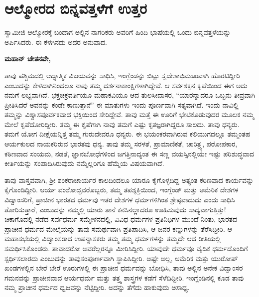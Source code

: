
\chapter{ಆಲ್ಮೋರದ ಬಿನ್ನವತ್ತಳೆಗೆ ಉತ್ತರ}

ಸ್ವಾಮೀಜಿ ಆಲ್ಮೋರಕ್ಕೆ ಬಂದಾಗ ಅಲ್ಲಿನ ನಾಗರಿಕರು ಅವರಿಗೆ ಹಿಂದಿ ಭಾಷೆಯಲ್ಲಿ ಒಂದು ಬಿನ್ನವತ್ತಳೆಯನ್ನು ಅರ್ಪಿಸಿದರು. ಈ ಕೆಳಗಿನದು ಅದರ ಅನುವಾದ.

\vskip 6pt

\textbf{ಮಹಾನ್​ ಚೇತನವೇ,}

\vskip 6pt

ತಾವು ಪಶ್ಚಿಮದಲ್ಲಿ ಆಧ್ಯಾತ್ಮಿಕ ವಿಜಯವನ್ನು ಸಾಧಿಸಿ, ಇಂಗ್ಲೆಂಡನ್ನು ಬಿಟ್ಟು ಸ್ವದೇಶಾಭಿಮುಖವಾಗಿ ಹೊರಟಿದ್ದೀರಿ ಎಂಬುದನ್ನು ಕೇಳಿದಾಗಿನಿಂದಲೂ ನಾವು ತಮ್ಮ ದರ್ಶನಾಕಾಂಕ್ಷಿಗಳಾಗಿದ್ದೇವೆ. ಆ ಸರ್ವಶಕ್ತನ ಕೃಪೆಯಿಂದ ಈಗ ಅದು ನಮಗೆ ಲಭ್ಯವಾಗಿದೆ. ಭಕ್ತಚಕ್ರವರ್ತಿಯೂ ಮಹಾಕವಿಯೂ ಆದ ತುಲಸೀದಾಸರ, “ಯಾರನ್ನಾದರೂ ಒಬ್ಬನು ತೀವ್ರವಾಗಿ ಪ್ರೀತಿಸಿದರೆ ಅವನನ್ನು ಕಂಡೇ ಕಾಣುತ್ತಾನೆ” ಈ ಮಾತುಗಳು ಇಂದು ಪೂರ್ಣವಾಗಿ ಸತ್ಯವಾಗಿದೆ. ಇಂದು ನಾವಿಲ್ಲಿ ತಮ್ಮನ್ನು ವಿಶ್ವಾಸಪೂರ್ವಕವಾದ ಭಕ್ತಿಯಿಂದ ಸೇರಿದ್ದೇವೆ. ತಾವು ಮತ್ತೆ ಈ ಊರಿಗೆ ಭೇಟಿಕೊಡುವುದರ ಮೂಲಕ ನಮ್ಮ ಮೇಲೆ ಕೃಪೆದೋರಿದ್ದೀರಿ. ತಮ್ಮ ಈ ಕೃಪೆಗಾಗಿ ನಾವು ತಮಗೆ ಎಷ್ಟು ಕೃತಜ್ಞರಾಗಿದ್ದರೂ ಸಾಲದು. ತಾವು ಧನ್ಯರು. ತಮಗೆ ಯೋಗ ದೀಕ್ಷೆಯನ್ನಿತ್ತ ತಮ್ಮ ಗುರುದೇವರೂ ಧನ್ಯರು. ಈ ಭಯಂಕರವಾಗಿರುವ ಕಲಿಯುಗದಲ್ಲೂ ತಮ್ಮಂತಹ ಆರ್ಯಕುಲದ ನಾಯಕರಿರುವ ಭಾರತವು ಧನ್ಯ. ತಾವು ತಮ್ಮ ಸರಳತೆ, ಪ್ರಾಮಾಣಿಕತೆ, ಚಾರಿತ್ರ್ಯ, ಪರೋಪಕಾರ, ಕಠಿಣವಾದ ಸಂಯಮ, ನಡತೆ, ಜ್ಞಾನಬೋಧೆಗಳಿಂದ ಜಗತ್ತಿನಾದ್ಯಂತ ಈ ಸಣ್ಣ ವಯಸ್ಸಿನಲ್ಲಿಯೇ ಇಷ್ಟು ಪರಿಶುದ್ಧವಾದ ಕೀರ್ತಿಯನ್ನು ಸಂಪಾದಿಸಿರುವುದು ನಮ್ಮೆಲ್ಲರಿಗೂ ಹೆಮ್ಮೆಯ ವಿಷಯವಾಗಿದೆ.

\vskip 7pt

ತಾವು ವಾಸ್ತವವಾಗಿ, ಶ‍್ರೀ ಶಂಕರಾಚಾರ್ಯರ ಕಾಲದಿಂದಲೂ ಯಾರೂ ಕೈಗೊಳ್ಳದಿದ್ದ ಅತ್ಯಂತ ಕಠಿಣವಾದ ಕಾರ್ಯವನ್ನು ಕೈಗೊಂಡಿದ್ದೀರಿ. ಆರ್ಯ ವಂಶೋದ್ಭವರೊಬ್ಬರು, ತಮ್ಮ ತಪಶ್ಶಕ್ತಿಯಿಂದ, ಇಂಗ್ಲೆಂಡ್​ ಮತ್ತು ಅಮೆರಿಕ ದೇಶಗಳ ವಿದ್ವಾಂಸರಿಗೆ, ಪ್ರಾಚೀನ ಭಾರತದ ಧರ್ಮವು ಇತರ ದೇಶಗಳ ಧರ್ಮಗಳಿಗಿಂತ ಶ್ರೇಷ್ಠವಾದುದು ಎಂದು ಸಾಧಿಸಿ ತೋರಿಸುತ್ತಾರೆ, ಎಂಬುದನ್ನು ನಮ್ಮಲ್ಲಿ ಯಾರು ತಾನೆ ಕನಸಿನಲ್ಲಾದರೂ ಊಹಿಸುವುದು ಸಾಧ್ಯವಾಗುತ್ತಿತ್ತು! ಚಿಕಾಗೊದಲ್ಲಿ ನಡೆದ ಸರ್ವಧರ್ಮ ಸಮ್ಮೇಳನದಲ್ಲಿ, ವಿವಿಧ ಧರ್ಮಗಳ ಪ್ರತಿನಿಧಿಗಳ ಮುಂದೆ ನಿಂತು, ಭಾರತದ ಪ್ರಾಚೀನ ಧರ್ಮದ ಮೇಲ್ಮೆಯನ್ನು ತಾವು ಸಮರ್ಥವಾಗಿ ಪ್ರತಿಪಾದಿಸಿ, ಆ ಜನರ ಕಣ್ಣುಗಳನ್ನು ತೆರೆಸಿದ್ದೀರಿ. ಆ ಮಹಾಸಭೆಯಲ್ಲಿ ವಿದ್ವಾಂಸರಾದ ಉಪನ್ಯಾಸಕರು ತಮ್ಮ ತಮ್ಮ ಧರ್ಮಗಳನ್ನು ತಮ್ಮದೇ ಆದ ರೀತಿಯಲ್ಲಿ ಸಮರ್ಥಿಸಿಕೊಂಡರು. ತಾವಾದರೋ ಅವರೆಲ್ಲರನ್ನೂ ಮೀರಿಸಿದ್ದೀರಿ. ಯಾವುದೇ ಧರ್ಮವೂ ವೈದಿಕ ಧರ್ಮದೊಂದಿಗೆ ಸ್ಪರ್ಧಿಸಲಾರದು ಎಂಬುದನ್ನು ತಾವು\break ಸಂಪೂರ್ಣವಾಗಿ ಸ್ಥಾಪಿಸಿದ್ದೀರಿ. ಅಷ್ಟೇ ಅಲ್ಲ, ಅಮೆರಿಕ ಮತ್ತು ಯುರೋಪ್​ ಖಂಡಗಳಲ್ಲಿನ ಬೇರೆ ಬೇರೆ ಊರುಗಳಲ್ಲಿ ಈ ಪ್ರಾಚೀನ ಧರ್ಮವನ್ನು ಬೋಧಿಸಿ, ತಾವು ಅಲ್ಲಿನ ಅನೇಕ ವಿದ್ವಾಂಸರ ಗಮನವನ್ನು ಪ್ರಾಚೀನವಾದ ಆರ್ಯಧರ್ಮ ಮತ್ತು ತತ್ತ್ವ ಶಾಸ್ತ್ರಗಳ ಕಡೆಗೆ ಸೆಳೆದಿದ್ದೀರಿ. ಇಂಗ್ಲೆಂಡಿನಲ್ಲಿ ಕೂಡ ತಾವು ನಮ್ಮ ಪ್ರಾಚೀನ ಧರ್ಮದ ಧ್ವಜವನ್ನು ನೆಟ್ಟಿದ್ದೀರಿ. ಅದನ್ನು ತೆಗೆದು ಹಾಕುವುದು ಅಸಾಧ್ಯ.

\vskip 7pt

